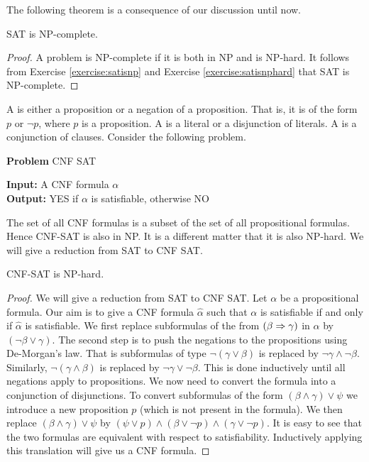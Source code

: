 The following theorem is a consequence of our discussion until now.
\begin{theorem}
SAT is NP-complete.
\end{theorem}
\begin{proof}
A problem is NP-complete if it is both in NP and is NP-hard. It follows from Exercise \ref{exercise:satisnp} and Exercise \ref{exercise:satisnphard} that SAT is NP-complete.
\end{proof}

A  is either a proposition or a negation of a proposition. That is, it is of the form $p$ or $\neg p$, where $p$ is a proposition. A  is a literal or a disjunction of literals. A  is a conjunction of clauses. Consider the following problem.

\begin{problem}
\caption*{{\bf Problem} CNF SAT}
{\bf Input: } A CNF formula $\alpha$ \\
{\bf Output: } YES if $\alpha$ is satisfiable, otherwise NO
\label{prblm:cnfsat}
\end{problem}

The set of all CNF formulas is a subset of the set of all propositional formulas. Hence CNF-SAT is also in NP. It is a different matter that it is also NP-hard. We will give a reduction from SAT to CNF SAT.
\begin{theorem}
CNF-SAT is NP-hard.
\end{theorem}
\begin{proof}
We will give a reduction from SAT to CNF SAT. Let $\alpha$ be a propositional formula. Our aim is to give a CNF formula $\hat \alpha$ such that $\alpha$ is satisfiable if and only if $\hat \alpha$ is satisfiable. We first replace subformulas of the from $(\beta \Rightarrow \gamma)$ in $\alpha$ by $(\neg \beta \vee \gamma)$. The second step is to push the negations to the propositions using De-Morgan's law. That is subformulas of type $\neg (\gamma \vee \beta)$ is replaced by $\neg \gamma \wedge \neg \beta$. Similarly, $\neg (\gamma \wedge \beta)$ is replaced by $\neg \gamma \vee \neg \beta$. This is done inductively until all negations apply to propositions. We now need to convert the formula into a conjunction of disjunctions. To convert subformulas of the form $(\beta \wedge \gamma) \vee \psi$ we introduce a new proposition $p$ (which is not present in the formula). We then replace $(\beta \wedge \gamma) \vee \psi$ by $(\psi \vee p) \wedge (\beta \vee \neg p) \wedge (\gamma \vee \neg p)$. It is easy to see that the two formulas are equivalent with respect to satisfiability. Inductively applying this translation will give us a CNF formula.
\end{proof}



